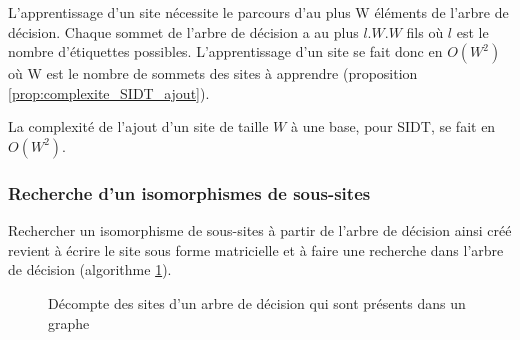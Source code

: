 L'apprentissage d'un site nécessite le parcours d'au plus W éléments de l'arbre de décision. Chaque sommet de l'arbre de décision a au plus $l.W.W$ fils où $l$ est le nombre d'étiquettes possibles. L'apprentissage d'un site se fait donc en $O(W^2)$ où W est le nombre de sommets des sites à apprendre (proposition \ref{prop:complexite_SIDT_ajout}).

\begin{prop}
 La complexité de l'ajout d'un site de taille $W$ à une base, pour SIDT, se fait en $O(W^2)$.
\label{prop:complexite_SIDT_ajout}
\end{prop}

\FloatBarrier
\subsubsection{Recherche d'un isomorphismes de sous-sites}
Rechercher un isomorphisme de sous-sites à partir de l'arbre de décision ainsi créé revient à écrire le site sous forme matricielle et à faire une recherche dans l'arbre de décision (algorithme \ref{algo:sidt}).

\begin{figure}[h]
\begin{algorithm}[H] %
\caption{Décompte des sites d'un arbre de décision qui sont présents dans un graphe}
\SetAlgoLined
{}

\label{algo:sidt}
\end{algorithm}
\end{figure}

